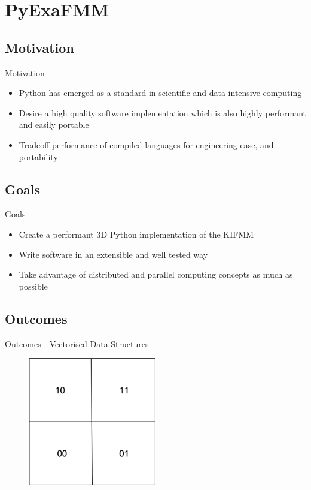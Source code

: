 \section{PyExaFMM}

\subsection{Motivation}
\begin{frame}{Motivation}
    \begin{itemize}
        \item Python has emerged as a standard in scientific and data intensive computing
        \item Desire a high quality software implementation which is also highly performant and easily portable
        \item Tradeoff performance of compiled languages for engineering ease, and portability
    \end{itemize}
\end{frame}

\subsection{Goals}
\begin{frame}{Goals}
    \begin{itemize}
        \item Create a performant 3D Python implementation of the KIFMM
        \item Write software in an extensible and well tested way
        \item Take advantage of distributed and parallel computing concepts as much as possible
    \end{itemize}
\end{frame}

\subsection{Outcomes}
\begin{frame}{Outcomes - Vectorised Data Structures}
    \begin{figure}
        \centering
        \includegraphics[width=0.5\textwidth]{assets/morton_coarser.png}
    \end{figure}
    \vspace{50pt}
\end{frame}

